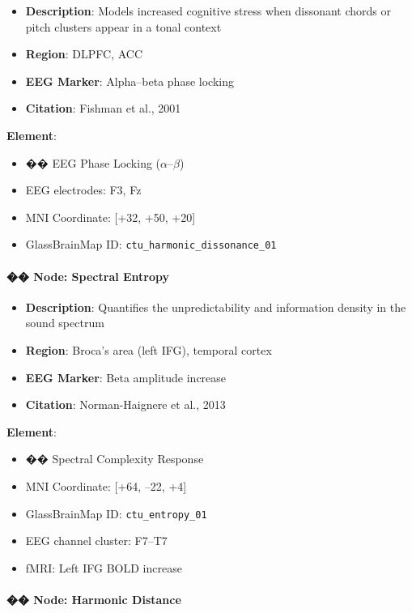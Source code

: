 \begin{itemize}
    \item \textbf{Description}: Models increased cognitive stress when dissonant chords or pitch clusters appear in a tonal context
    \item \textbf{Region}: DLPFC, ACC
    \item \textbf{EEG Marker}: Alpha–beta phase locking
    \item \textbf{Citation}: Fishman et al., 2001
\end{itemize}

\textbf{Element}:
\begin{itemize}
    \item �� EEG Phase Locking ($\alpha$–$\beta$)
    \item EEG electrodes: F3, Fz
    \item MNI Coordinate: [+32, +50, +20]
    \item GlassBrainMap ID: \texttt{ctu\_harmonic\_dissonance\_01}
\end{itemize}

\paragraph{�� Node: Spectral Entropy}

\begin{itemize}
    \item \textbf{Description}: Quantifies the unpredictability and information density in the sound spectrum
    \item \textbf{Region}: Broca’s area (left IFG), temporal cortex
    \item \textbf{EEG Marker}: Beta amplitude increase
    \item \textbf{Citation}: Norman-Haignere et al., 2013
\end{itemize}

\textbf{Element}:
\begin{itemize}
    \item �� Spectral Complexity Response
    \item MNI Coordinate: [+64, –22, +4]
    \item GlassBrainMap ID: \texttt{ctu\_entropy\_01}
    \item EEG channel cluster: F7–T7
    \item fMRI: Left IFG BOLD increase
\end{itemize}

\paragraph{�� Node: Harmonic Distance}

